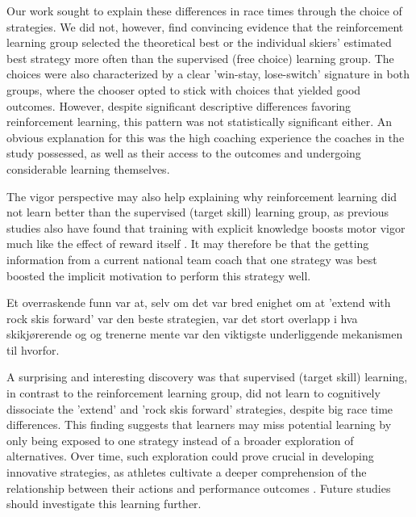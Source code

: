Our work sought to explain these differences in race times through the choice of strategies. We did not, however,  find convincing evidence that the reinforcement learning group selected the theoretical best or the individual skiers' estimated best strategy more often than the supervised (free choice) learning group. The choices were also characterized by a clear 'win-stay, lose-switch' signature in both groups, where the chooser opted to stick with choices that yielded good outcomes. However, despite significant descriptive differences favoring reinforcement learning, this pattern was not statistically significant either. An obvious explanation for this was the high coaching experience the coaches in the study possessed, as well as their access to the outcomes and undergoing considerable learning themselves. 


The vigor perspective may also help explaining why reinforcement learning did not learn better than the supervised (target skill) learning group, as previous studies also have found that training with explicit knowledge boosts motor vigor much like the effect of reward itself \cite{anderson_rewards_2020, wong_explicit_2015}. It may therefore be that the getting information from a current national team coach that one strategy was best boosted the implicit motivation to perform this strategy well. 


Et overraskende funn var at, selv om det var bred enighet om at 'extend with rock skis forward' var den beste strategien, var det stort overlapp i hva skikjørerende og og trenerne mente var den viktigste underliggende mekanismen til hvorfor. 


A surprising and interesting discovery was that supervised (target skill) learning, in contrast to the reinforcement learning group, did not learn to cognitively dissociate the 'extend' and 'rock skis forward' strategies, despite big race time differences. This finding suggests that learners may miss potential learning by only being exposed to one strategy instead of a broader exploration of alternatives. Over time, such exploration could prove crucial in developing innovative strategies, as athletes cultivate a deeper comprehension of the relationship between their actions and performance outcomes \cite{ericsson_scientific_1998}. Future studies should investigate this learning further. 


